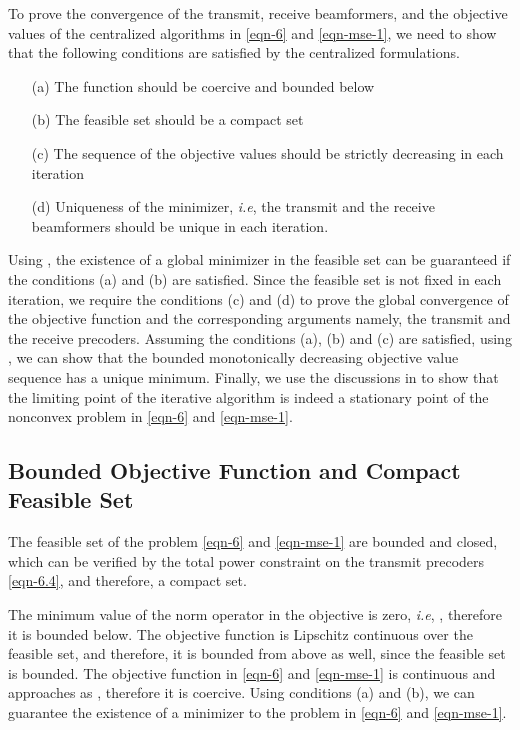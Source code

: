 \newcommand{\eqn}[1]{\(#1\)}
\newcommand{\mx}{\mbf{m}}
\newcommand{\my}{\mbf{w}}
\newcommand{\mz}{\mbfa{\gamma}}
\newcommand{\mxb}{{{\mbf{m}}}}
\newcommand{\myb}{{{\mbf{w}}}}
\newcommand{\iterate}[2]{{#1}^{(#2)}}
\newcommand{\iter}[3]{{#1}_{#2}^{(#3)}}
\newcommand{\ma}{\mbf{x}}

To prove the convergence of the transmit, receive beamformers, and the objective values of the centralized algorithms in \eqref{eqn-6} and \eqref{eqn-mse-1}, we need to show that the following conditions are satisfied by the centralized formulations.
\begin{itemize}
	\item[(a)] The function should be coercive and bounded below
	\item[(b)] The feasible set should be a compact set
	\item[(c)] The sequence of the objective values should be strictly decreasing in each iteration
	\item[(d)] Uniqueness of the minimizer, \textit{i.e}, the transmit and the receive beamformers should be unique in each iteration.
\end{itemize}
Using \cite[Prop. A.8]{bertsekas1999nonlinear}, the existence of a global minimizer in the feasible set can be guaranteed if the conditions (a) and (b) are satisfied. Since the feasible set is not fixed in each iteration, we require the conditions (c) and (d) to prove the global convergence of the objective function and the corresponding arguments namely, the transmit and the receive precoders. Assuming the conditions (a), (b) and (c) are satisfied, using \cite[Th. 3.14]{rudin1964principles}, we can show that the bounded monotonically decreasing objective value sequence has a unique minimum. Finally, we use the discussions in \cite{marks1978technical,lanckriet2009convergence} to show that the limiting point of the iterative algorithm is indeed a stationary point of the nonconvex problem in \eqref{eqn-6} and \eqref{eqn-mse-1}.

\subsection{Bounded Objective Function and Compact Feasible Set}

The feasible set of the problem \eqref{eqn-6} and \eqref{eqn-mse-1} are bounded and closed, which can be verified by the total power constraint on the transmit precoders \eqref{eqn-6.4}, and therefore, a compact set. 

The minimum value of the norm operator in the objective is zero, \textit{i.e}, , therefore it is bounded below. The objective function is Lipschitz continuous over the feasible set, and therefore, it is bounded from above as well, since the feasible set is bounded. The objective function in \eqref{eqn-6} and \eqref{eqn-mse-1} is continuous and approaches \me{\infty} as , therefore it is coercive. Using conditions (a) and (b), we can guarantee the existence of a minimizer to the problem in \eqref{eqn-6} and \eqref{eqn-mse-1}.

